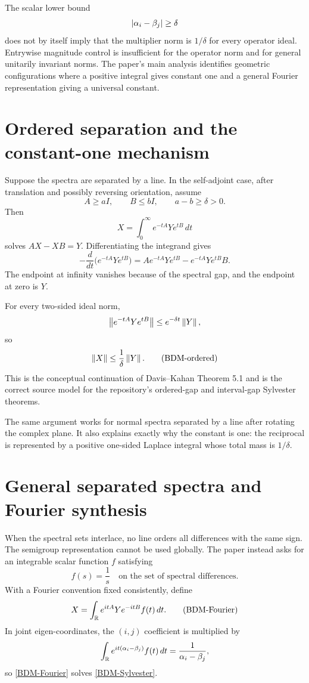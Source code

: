 The scalar lower bound
\[
  \left\lvert \alpha_i-\beta_j\right\rvert\ge\delta
\]
does not by itself imply that the multiplier norm is $1/\delta$ for every operator ideal. Entrywise magnitude control is insufficient for the operator norm and for general unitarily invariant norms. The paper's main analysis identifies geometric configurations where a positive integral gives constant one and a general Fourier representation giving a universal constant.

\section{Ordered separation and the constant-one mechanism}

Suppose the spectra are separated by a line. In the self-adjoint case, after translation and possibly reversing orientation, assume
\[
  A\ge aI,
  \qquad
  B\le bI,
  \qquad
  a-b\ge\delta>0.
\]
Then
\begin{equation}
  X=\int_0^\infty e^{-tA}Ye^{tB}\,dt
  \tag{BDM-semigroup}
\end{equation}
solves $AX-XB=Y$. Differentiating the integrand gives
\[
  -\frac{d}{dt}\bigl(e^{-tA}Ye^{tB}\bigr)
  =Ae^{-tA}Ye^{tB}-e^{-tA}Ye^{tB}B.
\]
The endpoint at infinity vanishes because of the spectral gap, and the endpoint at zero is $Y$.

For every two-sided ideal norm,
\[
  \left\lVert e^{-tA}Ye^{tB}\right\rVert
  \le e^{-\delta t}\left\lVert Y\right\rVert,
\]
so
\begin{equation}
  \left\lVert X\right\rVert\le\frac1\delta\left\lVert Y\right\rVert.
  \tag{BDM-ordered}
\end{equation}
This is the conceptual continuation of Davis--Kahan Theorem 5.1 and is the correct source model for the repository's ordered-gap and interval-gap Sylvester theorems.

The same argument works for normal spectra separated by a line after rotating the complex plane. It also explains exactly why the constant is one: the reciprocal is represented by a positive one-sided Laplace integral whose total mass is $1/\delta$.

\section{General separated spectra and Fourier synthesis}

When the spectral sets interlace, no line orders all differences with the same sign. The semigroup representation cannot be used globally. The paper instead asks for an integrable scalar function $f$ satisfying
\begin{equation}
  \widehat f(s)=\frac1s
  \quad\text{on the set of spectral differences.}
  \tag{BDM-reciprocal}
\end{equation}
With a Fourier convention fixed consistently, define
\begin{equation}
  X=\int_{\mathbb{R}}e^{itA}Ye^{-itB}f(t)\,dt.
  \tag{BDM-Fourier}\label{BDM-Fourier}
\end{equation}
In joint eigen-coordinates, the $(i,j)$ coefficient is multiplied by
\[
  \int_{\mathbb{R}}e^{it(\alpha_i-\beta_j)}f(t)\,dt
  =\frac1{\alpha_i-\beta_j},
\]
so \eqref{BDM-Fourier} solves \eqref{BDM-Sylvester}.

